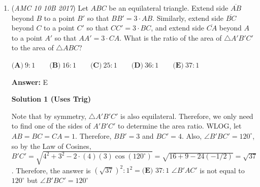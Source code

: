 \begin{enumerate}
the position is identical under reflection over a vertical line. All other 8 positions have a reflection that is different. Thus, we can count only half of these 8 positions (because otherwise we would be over counting), but we can count both of the two special cases (since they don't make a different image when reflected. Thus, this case has $\frac{8}{2}+2=6$ cases.

 In the second case, the green ball is placed in the bottom-middle position. Similarly, the other five balls can be placed in $\tbinom{5}{2}$ ways. In the special cases, 

 \begin{verbatim}
B                                  B R R                and             B BB G B                              R G R
\end{verbatim}

the position is identical under reflection over a vertical line. Proceeding just like the first case, there are $\frac{8}{2}+2=6$ cases.

 In total, there are $6+6=\boxed{\textbf{(D) }12}$ different paintings.

 


	\item (\textit{AMC 10 10B 2017}) Let $ABC$ be an equilateral triangle. Extend side $\overline{AB}$ beyond $B$ to a point $B'$ so that $BB'=3 \cdot AB$. Similarly, extend side $\overline{BC}$ beyond $C$ to a point $C'$ so that $CC'=3 \cdot BC$, and extend side $\overline{CA}$ beyond $A$ to a point $A'$ so that $AA'=3 \cdot CA$. What is the ratio of the area of $\triangle A'B'C'$ to the area of $\triangle ABC$?


 $\textbf{(A)}\ 9:1\qquad\textbf{(B)}\ 16:1\qquad\textbf{(C)}\ 25:1\qquad\textbf{(D)}\ 36:1\qquad\textbf{(E)}\ 37:1$

 \textbf{Answer: }E



\textbf{Solution 1 (Uses Trig)}

Note that by symmetry, $\triangle A'B'C'$ is also equilateral. Therefore, we only need to find one of the sides of $A'B'C'$ to determine the area ratio. WLOG, let $AB = BC = CA = 1$. Therefore, $BB' = 3$ and $BC' = 4$. Also, $\angle B'BC' = 120^{\circ}$, so by the Law of Cosines, $B'C' = \sqrt{4^2 + 3^2 - 2\cdot(4)(3)\cos(120^\circ)} = \sqrt{16+9 - 24(-1/2)} = \sqrt{37}$. Therefore, the answer is $(\sqrt{37})^2 : 1^2 = \boxed{\textbf{(E) } 37:1}$
$\angle B'AC'$  is not equal to $120^{\circ}$ but $\angle B'BC' = 120^{\circ}$





\end{enumerate}
